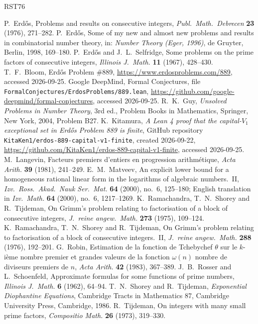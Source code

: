 \documentclass[10pt]{article}
\numberwithin{equation}{section}
\theoremstyle{definition}
\theoremstyle{plain}
\begin{document}
\begin{thebibliography}{RST76}\footnotesize\raggedright\setlength{\itemsep}{0.5pt}
 P.~Erd\H{o}s, Problems and results on consecutive integers, \emph{Publ.\ Math.\ Debrecen}
\textbf{23} (1976), 271--282.
 P.~Erd\H{o}s, Some of my new and almost new problems and results in combinatorial number
theory, in: \emph{Number Theory (Eger, 1996)}, de Gruyter, Berlin, 1998, 169--180.
 P.~Erd\H{o}s and J.~L.~Selfridge, Some problems on the prime factors of consecutive
integers, \emph{Illinois J.\ Math.} \textbf{11} (1967), 428--430.
 T.~F.~Bloom, Erd\H{o}s Problem \#889, \url{https://www.erdosproblems.com/889},
accessed 2026-09-25.
 Google DeepMind, Formal Conjectures, file \texttt{FormalConjectures/ErdosProblems/889.lean},
\url{https://github.com/google-deepmind/formal-conjectures}, accessed 2026-09-25.
 R.~K.~Guy, \emph{Unsolved Problems in Number Theory}, 3rd ed., Problem Books in
Mathematics, Springer, New York, 2004, Problem B27.
 K.~Kitamura, \emph{A Lean 4 proof that the capital-$V_1$ exceptional set in Erd\H{o}s
Problem 889 is finite}, GitHub repository \texttt{KitaKen1/erdos-889-capital-v1-finite}, created 2026-09-22,
\url{https://github.com/KitaKen1/erdos-889-capital-v1-finite}, accessed 2026-09-25.
 M.~Langevin, Facteurs premiers d'entiers en progression arithm\'etique, \emph{Acta Arith.}
\textbf{39} (1981), 241--249.
 E.~M.~Matveev, An explicit lower bound for a homogeneous rational linear form in the
logarithms of algebraic numbers.~II, \emph{Izv.\ Ross.\ Akad.\ Nauk Ser.\ Mat.} \textbf{64} (2000), no.~6,
125--180; English translation in \emph{Izv.\ Math.} \textbf{64} (2000), no.~6, 1217--1269.
 K.~Ramachandra, T.~N.~Shorey and R.~Tijdeman, On Grimm's problem relating to
factorisation of a block of consecutive integers, \emph{J.\ reine angew.\ Math.} \textbf{273} (1975), 109--124.
 K.~Ramachandra, T.~N.~Shorey and R.~Tijdeman, On Grimm's problem relating to
factorisation of a block of consecutive integers.~II, \emph{J.\ reine angew.\ Math.} \textbf{288} (1976),
192--201.
 G.~Robin, Estimation de la fonction de Tchebychef $\theta$ sur le $k$-i\`eme nombre premier
et grandes valeurs de la fonction $\omega(n)$ nombre de diviseurs premiers de $n$, \emph{Acta Arith.} \textbf{42}
(1983), 367--389.
 J.~B.~Rosser and L.~Schoenfeld, Approximate formulas for some functions of prime numbers,
\emph{Illinois J.\ Math.} \textbf{6} (1962), 64--94.
 T.~N.~Shorey and R.~Tijdeman, \emph{Exponential Diophantine Equations}, Cambridge Tracts in
Mathematics 87, Cambridge University Press, Cambridge, 1986.
 R.~Tijdeman, On integers with many small prime factors, \emph{Compositio Math.} \textbf{26}
(1973), 319--330.
\end{thebibliography}
\end{document}
